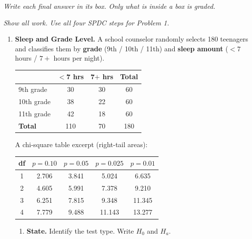 \documentclass[10pt]{article}
\begin{document}
{\small\itshape Write each final answer in its box. Only what is inside a box is graded.}\par

\vspace{0.08in}

\textit{Show all work. Use all four SPDC steps for Problem 1.}

\begin{enumerate}[itemsep=10pt]

\item \textbf{Sleep and Grade Level.}
A school counselor randomly selects 180 teenagers and classifies them by
\textbf{grade} (9th / 10th / 11th) and \textbf{sleep amount} ($<7$ hours / $7{+}$ hours per night).

\renewcommand{\arraystretch}{1.4}
\begin{center}
\begin{tabular}{@{} l c c c @{}}
\hline
           & \textbf{$<$7 hrs} & \textbf{7$+$ hrs} & \textbf{Total} \\
\hline
9th grade  & 30 & 30 & 60  \\
10th grade & 38 & 22 & 60  \\
11th grade & 42 & 18 & 60  \\
\hline
\textbf{Total} & 110 & 70 & 180 \\
\hline
\end{tabular}
\end{center}

A chi-square table excerpt (right-tail areas):

\renewcommand{\arraystretch}{1.3}
\begin{center}\small
\begin{tabular}{@{} c c c c c @{}}
\hline
\textbf{df} & $p = 0.10$ & $p = 0.05$ & $p = 0.025$ & $p = 0.01$ \\
\hline
1  & 2.706  & 3.841  & 5.024  & 6.635  \\
2  & 4.605  & 5.991  & 7.378  & 9.210  \\
3  & 6.251  & 7.815  & 9.348  & 11.345 \\
4  & 7.779  & 9.488  & 11.143 & 13.277 \\
\hline
\end{tabular}
\end{center}

\begin{enumerate}[label=\alph*., itemsep=6pt]
  \item \textbf{State.} Identify the test type. Write $H_0$ and $H_a$.


\end{enumerate}
\end{enumerate}
\end{document}
